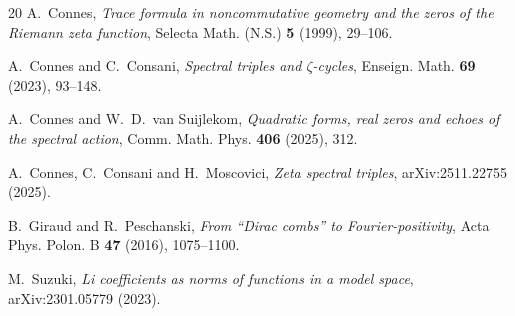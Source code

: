 \documentclass[11pt,oneside]{article}
\theoremstyle{remark}
\begin{document}
\begin{thebibliography}{20}
 A.~Connes,
\emph{Trace formula in noncommutative geometry and the zeros of the Riemann
zeta function}, Selecta Math. (N.S.) \textbf{5} (1999), 29--106.

 A.~Connes and C.~Consani,
\emph{Spectral triples and $\zeta$-cycles},
Enseign. Math. \textbf{69} (2023), 93--148.

 A.~Connes and W.~D.~van Suijlekom,
\emph{Quadratic forms, real zeros and echoes of the spectral action},
Comm. Math. Phys. \textbf{406} (2025), 312.

 A.~Connes, C.~Consani and H.~Moscovici,
\emph{Zeta spectral triples}, arXiv:2511.22755 (2025).

 B.~Giraud and R.~Peschanski,
\emph{From ``Dirac combs'' to Fourier-positivity},
Acta Phys. Polon. B \textbf{47} (2016), 1075--1100.

 M.~Suzuki,
\emph{Li coefficients as norms of functions in a model space},
arXiv:2301.05779 (2023).

\end{thebibliography}
\end{document}
